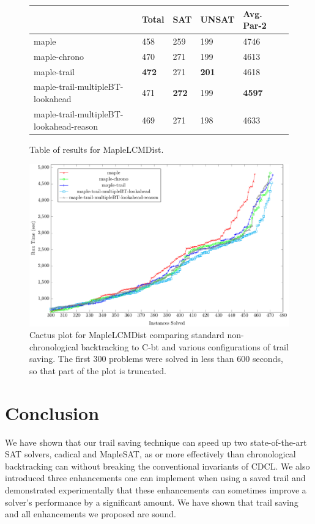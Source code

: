 \documentclass[runningheads]{llncs}
\newcommand{\sat}{SAT\xspace}
\newcommand{\cbt}{C-bt\xspace}
\begin{document}
\begin{figure}
\centering
    \begin{tabular}{|l|l|l|l|l|l|}
      \hline
      & Total & SAT & UNSAT & Avg. Par-2 \\ \hline
      maple           & 458          & 259 &  199  & 4746                             \\ \hline
      maple-chrono   & 470          & 271 &  199  & 4613                             \\ \hline
      maple-trail    & \textbf{472}          & 271 &  \textbf{201}  & 4618                \\ \hline
      maple-trail-multipleBT-lookahead & 471 & \textbf{272} &  199  & \textbf{4597}        \\ \hline
      maple-trail-multipleBT-lookahead-reason & 469 & 271 & 198 & 4633 \\ \hline
    \end{tabular}
    \caption{Table of results for MapleLCMDist.}
    \label{fig:maple}
\end{figure}

\begin{figure}\centering\includegraphics[scale=0.65]{figures/cactus_maple_new.pdf}\caption{\small{Cactus plot for MapleLCMDist comparing standard non-chronological backtracking to \cbt and various configurations of trail saving. The first 300 problems were solved in less than 600 seconds, so that part of the plot is truncated.}}\label{fig:cactus_maple}\end{figure}

\section{Conclusion}
We have shown that our trail saving technique can speed up two
state-of-the-art \sat solvers, cadical and MapleSAT, as or more
effectively than chronological backtracking can without breaking the
conventional invariants of CDCL. We also introduced three enhancements
one can implement when using a saved trail and demonstrated
experimentally that these enhancements can sometimes improve a
solver's performance by a significant amount. We have shown that trail
saving and all enhancements we proposed are sound.
\end{document}
